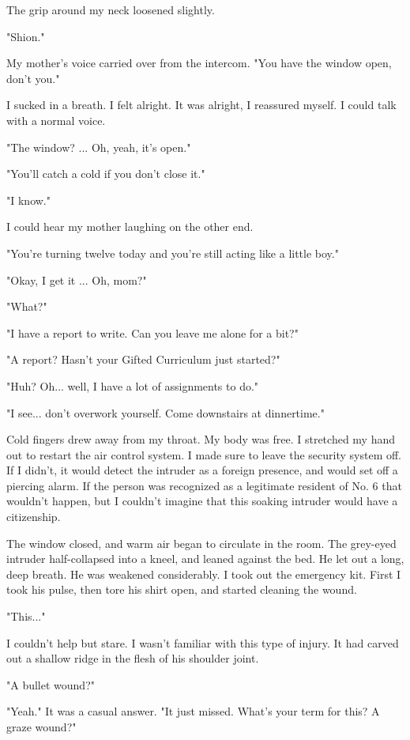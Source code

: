 The grip around my neck loosened slightly.

\myspace

"Shion."

My mother's voice carried over from the intercom. "You have the window
open, don't you."

I sucked in a breath. I felt alright. It was alright, I reassured
myself. I could talk with a normal voice.

"The window? ... Oh, yeah, it's open."

"You'll catch a cold if you don't close it."

"I know."

I could hear my mother laughing on the other end.

"You're turning twelve today and you're still acting like a little boy."

"Okay, I get it ... Oh, mom?"

"What?"

"I have a report to write. Can you leave me alone for a bit?"

"A report? Hasn't your Gifted Curriculum just started?"

"Huh? Oh... well, I have a lot of assignments to do."

"I see... don't overwork yourself. Come downstairs at dinnertime."

\myspace

Cold fingers drew away from my throat. My body was free. I stretched my
hand out to restart the air control system. I made sure to leave the
security system off. If I didn't, it would detect the intruder as a
foreign presence, and would set off a piercing alarm. If the person was
recognized as a legitimate resident of No. 6 that wouldn't happen, but I
couldn't imagine that this soaking intruder would have a citizenship.

The window closed, and warm air began to circulate in the room. The
grey-eyed intruder half-collapsed into a kneel, and leaned against the
bed. He let out a long, deep breath. He was weakened considerably. I
took out the emergency kit. First I took his pulse, then tore his shirt
open, and started cleaning the wound.

"This..."

I couldn't help but stare. I wasn't familiar with this type of injury.
It had carved out a shallow ridge in the flesh of his shoulder joint.

"A bullet wound?"

"Yeah." It was a casual answer. "It just missed. What's your term for
this? A graze wound?"

